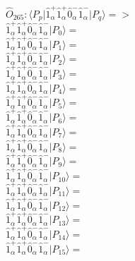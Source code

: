\documentclass[14pt]{article}
\begin{document}
    $\hat{O}_{265}:  \langle{P_p}\vert \hat{1}_{\alpha}^{+}\hat{1}_{\alpha}^{+}\hat{0}_{\alpha}^{-}\hat{1}_{\alpha}^{-} \vert{P_q}\rangle => $ \\ 
    $ \hat{1}_{\alpha}^{+}\hat{1}_{\alpha}^{+}\hat{0}_{\alpha}^{-}\hat{1}_{\alpha}^{-} \vert{P_{0}}\rangle =  $ \\ 
    $ \hat{1}_{\alpha}^{+}\hat{1}_{\alpha}^{+}\hat{0}_{\alpha}^{-}\hat{1}_{\alpha}^{-} \vert{P_{1}}\rangle =  $ \\ 
    $ \hat{1}_{\alpha}^{+}\hat{1}_{\alpha}^{+}\hat{0}_{\alpha}^{-}\hat{1}_{\alpha}^{-} \vert{P_{2}}\rangle =  $ \\ 
    $ \hat{1}_{\alpha}^{+}\hat{1}_{\alpha}^{+}\hat{0}_{\alpha}^{-}\hat{1}_{\alpha}^{-} \vert{P_{3}}\rangle =  $ \\ 
    $ \hat{1}_{\alpha}^{+}\hat{1}_{\alpha}^{+}\hat{0}_{\alpha}^{-}\hat{1}_{\alpha}^{-} \vert{P_{4}}\rangle =  $ \\ 
    $ \hat{1}_{\alpha}^{+}\hat{1}_{\alpha}^{+}\hat{0}_{\alpha}^{-}\hat{1}_{\alpha}^{-} \vert{P_{5}}\rangle =  $ \\ 
    $ \hat{1}_{\alpha}^{+}\hat{1}_{\alpha}^{+}\hat{0}_{\alpha}^{-}\hat{1}_{\alpha}^{-} \vert{P_{6}}\rangle =  $ \\ 
    $ \hat{1}_{\alpha}^{+}\hat{1}_{\alpha}^{+}\hat{0}_{\alpha}^{-}\hat{1}_{\alpha}^{-} \vert{P_{7}}\rangle =  $ \\ 
    $ \hat{1}_{\alpha}^{+}\hat{1}_{\alpha}^{+}\hat{0}_{\alpha}^{-}\hat{1}_{\alpha}^{-} \vert{P_{8}}\rangle =  $ \\ 
    $ \hat{1}_{\alpha}^{+}\hat{1}_{\alpha}^{+}\hat{0}_{\alpha}^{-}\hat{1}_{\alpha}^{-} \vert{P_{9}}\rangle =  $ \\ 
    $ \hat{1}_{\alpha}^{+}\hat{1}_{\alpha}^{+}\hat{0}_{\alpha}^{-}\hat{1}_{\alpha}^{-} \vert{P_{10}}\rangle =  $ \\ 
    $ \hat{1}_{\alpha}^{+}\hat{1}_{\alpha}^{+}\hat{0}_{\alpha}^{-}\hat{1}_{\alpha}^{-} \vert{P_{11}}\rangle =  $ \\ 
    $ \hat{1}_{\alpha}^{+}\hat{1}_{\alpha}^{+}\hat{0}_{\alpha}^{-}\hat{1}_{\alpha}^{-} \vert{P_{12}}\rangle =  $ \\ 
    $ \hat{1}_{\alpha}^{+}\hat{1}_{\alpha}^{+}\hat{0}_{\alpha}^{-}\hat{1}_{\alpha}^{-} \vert{P_{13}}\rangle =  $ \\ 
    $ \hat{1}_{\alpha}^{+}\hat{1}_{\alpha}^{+}\hat{0}_{\alpha}^{-}\hat{1}_{\alpha}^{-} \vert{P_{14}}\rangle =  $ \\ 
    $ \hat{1}_{\alpha}^{+}\hat{1}_{\alpha}^{+}\hat{0}_{\alpha}^{-}\hat{1}_{\alpha}^{-} \vert{P_{15}}\rangle =  $ \\ 
    
\end{document}
